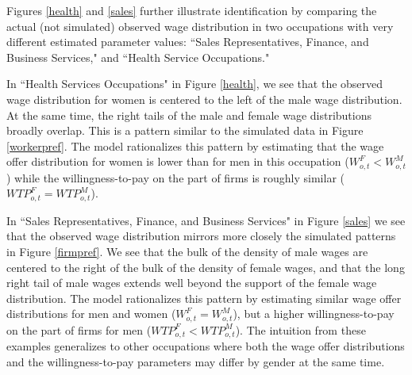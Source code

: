 \documentclass[12pt]{article}
\begin{document}


Figures \ref{health} and \ref{sales} further illustrate identification by comparing the actual (not simulated) observed wage distribution in two occupations with very different estimated parameter values: ``Sales Representatives, Finance, and Business Services," and ``Health Service Occupations."


In ``Health Services Occupations" in Figure \ref{health}, we see that the observed wage distribution for women is centered to the left of the male wage distribution. At the same time, the right tails of the male and female wage distributions broadly overlap. This is a pattern similar to the simulated data in Figure \ref{workerpref}. The model rationalizes this pattern by estimating that the wage offer distribution for women is lower than for men in this occupation ($W^F_{o,t} < W^M_{o,t}$) while the willingness-to-pay on the part of firms is roughly similar ($WTP^F_{o,t} = WTP^M_{o,t}$).

In ``Sales Representatives, Finance, and Business Services" in Figure \ref{sales} we see that the observed wage distribution mirrors more closely the simulated patterns in Figure \ref{firmpref}. We see that the bulk of the density of male wages are centered to the right of the bulk of the density of female wages, and that the long right tail of male wages extends well beyond the support of the female wage distribution. The model rationalizes this pattern by estimating similar wage offer distributions for men and women ($W^F_{o,t} = W^M_{o,t}$), but a higher willingness-to-pay on the part of firms for men ($WTP^F_{o,t} < WTP^M_{o,t}$). The intuition from these examples generalizes to other occupations where both the wage offer distributions and the willingness-to-pay parameters may differ by gender at the same time. 
\end{document}
